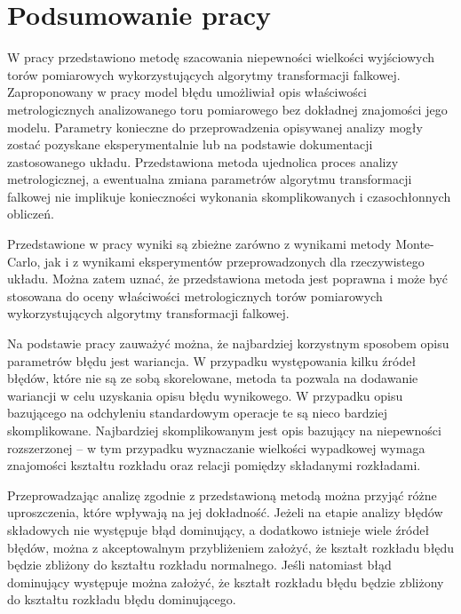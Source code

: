 \chapter{Podsumowanie pracy}

W pracy przedstawiono metodę szacowania niepewności wielkości wyjściowych torów pomiarowych wykorzystujących algorytmy transformacji falkowej. Zaproponowany w pracy model błędu umożliwiał opis właściwości metrologicznych analizowanego toru pomiarowego bez dokładnej znajomości jego modelu. Parametry konieczne do przeprowadzenia opisywanej analizy mogły zostać pozyskane eksperymentalnie lub na podstawie dokumentacji zastosowanego układu. Przedstawiona metoda ujednolica proces analizy metrologicznej, a ewentualna zmiana parametrów algorytmu transformacji falkowej nie implikuje konieczności wykonania skomplikowanych i czasochłonnych obliczeń.

Przedstawione w pracy wyniki są zbieżne zarówno z wynikami metody Monte-Carlo, jak i z wynikami eksperymentów przeprowadzonych dla rzeczywistego układu. Można zatem uznać, że przedstawiona metoda jest poprawna i może być stosowana do oceny właściwości metrologicznych torów pomiarowych wykorzystujących algorytmy transformacji falkowej.

Na podstawie pracy zauważyć można, że najbardziej korzystnym sposobem opisu parametrów błędu jest wariancja. W przypadku występowania kilku źródeł błędów, które nie są ze sobą skorelowane, metoda ta pozwala na dodawanie wariancji w celu uzyskania opisu błędu wynikowego. W przypadku opisu bazującego na odchyleniu standardowym operacje te są nieco bardziej skomplikowane. Najbardziej skomplikowanym jest opis bazujący na niepewności rozszerzonej -- w tym przypadku wyznaczanie wielkości wypadkowej wymaga znajomości kształtu rozkładu oraz relacji pomiędzy składanymi rozkładami.

Przeprowadzając analizę zgodnie z przedstawioną metodą można przyjąć różne uproszczenia, które wpływają na jej dokładność. Jeżeli na etapie analizy błędów składowych nie występuje błąd dominujący, a dodatkowo istnieje wiele źródeł błędów, można z akceptowalnym przybliżeniem założyć, że kształt rozkładu błędu będzie zbliżony do kształtu rozkładu normalnego. Jeśli natomiast błąd dominujący występuje można założyć, że kształt rozkładu błędu będzie zbliżony do kształtu rozkładu błędu dominującego.
